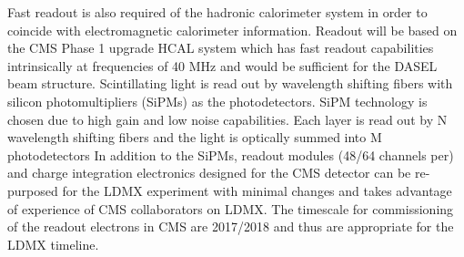 Fast readout is also required of the hadronic calorimeter system in order to coincide with electromagnetic calorimeter information. 
Readout will be based on the CMS Phase 1 upgrade HCAL system which has fast readout capabilities intrinsically at frequencies of 40 MHz and would be sufficient for the DASEL beam structure.  
Scintillating light is read out by wavelength shifting fibers with silicon photomultipliers (SiPMs) as the photodetectors.
SiPM technology is chosen due to high gain and low noise capabilities.  
Each layer is read out by N wavelength shifting fibers and the light is optically summed into M photodetectors
In addition to the SiPMs, readout modules (48/64 channels per) and charge integration electronics designed for the CMS detector can be re-purposed for the LDMX experiment with minimal changes and takes advantage of experience of CMS collaborators on LDMX.  
The timescale for commissioning of the readout electrons in CMS are 2017/2018 and thus are appropriate for the LDMX timeline.

